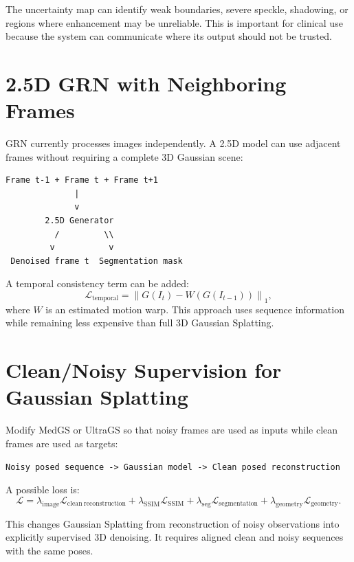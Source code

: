 \documentclass[11pt,a4paper]{article}
\begin{document}
The uncertainty map can identify weak boundaries, severe speckle, shadowing, or regions where enhancement may be unreliable. This is important for clinical use because the system can communicate where its output should not be trusted.

\section{2.5D GRN with Neighboring Frames}

GRN currently processes images independently. A 2.5D model can use adjacent frames without requiring a complete 3D Gaussian scene:

\begin{verbatim}
Frame t-1 + Frame t + Frame t+1
              |
              v
        2.5D Generator
          /         \\
         v           v
 Denoised frame t  Segmentation mask
\end{verbatim}

A temporal consistency term can be added:
\begin{equation}
    \mathcal{L}_{\mathrm{temporal}}
    = \left\|G(I_t)-W\left(G(I_{t-1})\right)\right\|_1,
\end{equation}
where $W$ is an estimated motion warp. This approach uses sequence information while remaining less expensive than full 3D Gaussian Splatting.

\section{Clean/Noisy Supervision for Gaussian Splatting}

Modify MedGS or UltraGS so that noisy frames are used as inputs while clean frames are used as targets:

\begin{verbatim}
Noisy posed sequence -> Gaussian model -> Clean posed reconstruction
\end{verbatim}

A possible loss is:
\begin{equation}
    \mathcal{L}
    = \lambda_{\mathrm{image}}\mathcal{L}_{\mathrm{clean\ reconstruction}}
    + \lambda_{\mathrm{SSIM}}\mathcal{L}_{\mathrm{SSIM}}
    + \lambda_{\mathrm{seg}}\mathcal{L}_{\mathrm{segmentation}}
    + \lambda_{\mathrm{geometry}}\mathcal{L}_{\mathrm{geometry}}.
\end{equation}

This changes Gaussian Splatting from reconstruction of noisy observations into explicitly supervised 3D denoising. It requires aligned clean and noisy sequences with the same poses.
\end{document}
